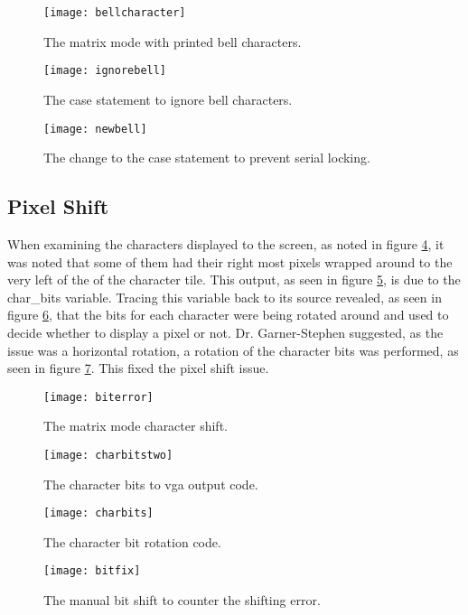 \begin{figure}
  \centering
  \texttt{[image: bellcharacter]}
  \caption{The matrix mode with printed bell characters.}
  \label{fig:bellcharacter}
\end{figure}

\begin{figure}
  \centering
  \texttt{[image: ignorebell]}
  \caption{The case statement to ignore bell characters.}
  \label{fig:ignorebell}
\end{figure}

\begin{figure}
  \centering
  \texttt{[image: newbell]}
  \caption{The change to the case statement to prevent serial locking.}
  \label{fig:newbell}
\end{figure}


\subsection{Pixel Shift}

\label{Ch5 Sec3 Sub3}

When examining the characters displayed to the screen, as noted in figure \ref{fig:biterror}, it was noted that some of them had their right most pixels wrapped around to the very left of the of the character tile. This output, as seen in figure \ref{fig:charbitstwo}, is due to the char\_bits variable. Tracing this variable back to its source revealed, as seen in figure \ref{fig:charbits}, that the bits for each character were being rotated around and used to decide whether to display a pixel or not. Dr. Garner-Stephen suggested, as the issue was a horizontal rotation, a rotation of the character bits was performed, as seen in figure \ref{fig:bitfix}. This fixed the pixel shift issue.

\begin{figure}
  \centering
  \texttt{[image: biterror]}
  \caption{The matrix mode character shift.}
  \label{fig:biterror}
\end{figure}

\begin{figure}
  \centering
  \texttt{[image: charbitstwo]}
  \caption{The character bits to vga output code.}
  \label{fig:charbitstwo}
\end{figure}

\begin{figure}
  \centering
  \texttt{[image: charbits]}
  \caption{The character bit rotation code.}
  \label{fig:charbits}
\end{figure}

\begin{figure}
  \centering
  \texttt{[image: bitfix]}
  \caption{The manual bit shift to counter the shifting error.}
  \label{fig:bitfix}
\end{figure}
